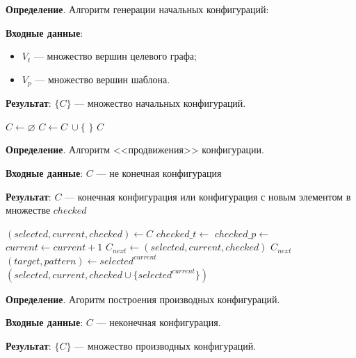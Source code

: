 \textbf{Определение}. Алгоритм генерации начальных конфигураций:

\textbf{Входные данные}:
\begin{itemize}
\item $V_t$ --- множество вершин целевого графа;
\item $V_p$ --- множество вершин шаблона.
\end{itemize}

\textbf{Результат}: $\{ C \}$ --- множество начальных конфигураций.

\begin{algorithmic}
    \State $C \gets \varnothing$
            \State $C \gets C \ \cup \{$  $\}$
        \EndFor
    \EndFor
    \State \Return $C$
\EndFunction
\end{algorithmic}

\textbf{Определение}. Алгоритм <<продвижения>> конфигурации.

\textbf{Входные данные}: $C$ --- не конечная конфигурация

\textbf{Результат}: $C$ --- конечная конфигурация или конфигурация с новым
элементом в множестве $checked$

\begin{algorithmic}
    \State $(selected, current, checked) \gets C$
    \State $checked\_t \gets$ 
    \State $checked\_p \gets$ 
        \State $current \gets current + 1$
        \State $C_{next} \gets (selected, current, checked)$
            \State \Return $C_{next}$
        \EndIf
        \State $(target, pattern) \gets selected^{current}$
            \State \Return $(selected, current, checked \cup \{ selected^{current} \})$
        \EndIf
    \EndWhile
\EndFunction
\end{algorithmic}

\textbf{Определение}. Агоритм построения производных конфигураций.

\textbf{Входные данные}: $C$ --- неконечная конфигурация.

\textbf{Результат}: $\{ C \}$ --- множество производных конфигураций.

